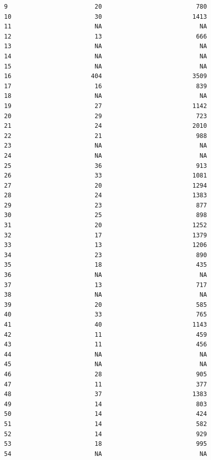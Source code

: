 \documentclass[
  letterpaper,
  DIV=11,
  numbers=noendperiod]{scrartcl}
\begin{document}
\begin{verbatim}
9                        20                          780
10                       30                         1413
11                       NA                           NA
12                       13                          666
13                       NA                           NA
14                       NA                           NA
15                       NA                           NA
16                      404                         3509
17                       16                          839
18                       NA                           NA
19                       27                         1142
20                       29                          723
21                       24                         2010
22                       21                          988
23                       NA                           NA
24                       NA                           NA
25                       36                          913
26                       33                         1081
27                       20                         1294
28                       24                         1383
29                       23                          877
30                       25                          898
31                       20                         1252
32                       17                         1379
33                       13                         1206
34                       23                          890
35                       18                          435
36                       NA                           NA
37                       13                          717
38                       NA                           NA
39                       20                          585
40                       33                          765
41                       40                         1143
42                       11                          459
43                       11                          456
44                       NA                           NA
45                       NA                           NA
46                       28                          905
47                       11                          377
48                       37                         1383
49                       14                          803
50                       14                          424
51                       14                          582
52                       14                          929
53                       18                          995
54                       NA                           NA

\end{verbatim}
\end{document}
